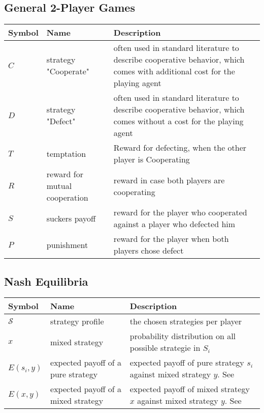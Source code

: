 \documentclass[a4paper,12pt]{scrartcl}
\begin{document}
\subsection{General 2-Player Games}

\begin{tabular}{C{0.1\textwidth}p{0.3\textwidth}p{0.6\textwidth}}
	\toprule
	Symbol & Name &  Description \\
	\midrule
	$C$ & strategy "Cooperate" & often used in standard literature to describe cooperative behavior, which comes with additional cost for the playing agent \\
	$D$ & strategy "Defect" & often used in standard literature to describe cooperative behavior, which comes without a cost for the playing agent \\[2em]
	$T$ & temptation & Reward for defecting, when the other player is Cooperating\\
	$R$ & reward for mutual \newline cooperation & reward in case both players are cooperating\\
	$S$ & suckers payoff & reward for the player who cooperated against a player who defected him\\
	$P$ & punishment & reward for the player when both players chose defect\\
	\bottomrule
\end{tabular}


\subsection{Nash Equilibria}

\begin{tabular}{C{0.1\textwidth}p{0.3\textwidth}p{0.6\textwidth}}
	\toprule
	Symbol & Name &  Description \\
	\midrule
	$\mathcal{S}$ & strategy profile & the chosen strategies per player\\
	$x$ & mixed strategy & probability distribution on all possible strategie in $S_i$ \\
	$E(s_i,y)$ & expected payoff of a \newline pure strategy & expected payoff of pure strategy $s_i$ against mixed strategy $y$. See \\
	$E(x,y)$ & expected payoff of a \newline mixed strategy & expected payoff of mixed strategy $x$ against mixed strategy $y$. See \\
	\bottomrule
\end{tabular}
\end{document}
